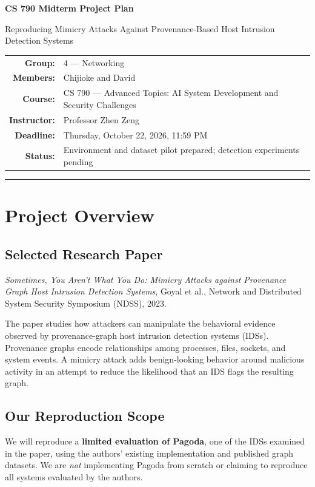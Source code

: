 \documentclass[11pt,letterpaper]{article}
\begin{document}
\begin{center}
{\LARGE\bfseries\color{navy} CS 790 Midterm Project Plan}\par\vspace{5pt}
{\large Reproducing Mimicry Attacks Against Provenance-Based Host Intrusion Detection Systems}\par\vspace{9pt}
\begin{tabular}{rl}
\textbf{Group:} & 4 --- Networking\\
\textbf{Members:} & Chijioke and David\\
\textbf{Course:} & CS 790 --- Advanced Topics: AI System Development and Security Challenges\\
\textbf{Instructor:} & Professor Zhen Zeng\\
\textbf{Deadline:} & Thursday, October 22, 2026, 11:59 PM\\
\textbf{Status:} & Environment and dataset pilot prepared; detection experiments pending
\end{tabular}
\end{center}
\vspace{4pt}\hrule\vspace{9pt}

\section{Project Overview}
\subsection{Selected Research Paper}
\emph{Sometimes, You Aren't What You Do: Mimicry Attacks against Provenance Graph Host Intrusion Detection Systems}, Goyal et al., Network and Distributed System Security Symposium (NDSS), 2023.

The paper studies how attackers can manipulate the behavioral evidence observed by provenance-graph host intrusion detection systems (IDSs). Provenance graphs encode relationships among processes, files, sockets, and system events. A mimicry attack adds benign-looking behavior around malicious activity in an attempt to reduce the likelihood that an IDS flags the resulting graph.

\subsection{Our Reproduction Scope}
We will reproduce a \textbf{limited evaluation of Pagoda}, one of the IDSs examined in the paper, using the authors' existing implementation and published graph datasets. We are \emph{not} implementing Pagoda from scratch or claiming to reproduce all systems evaluated by the authors.
\end{document}
